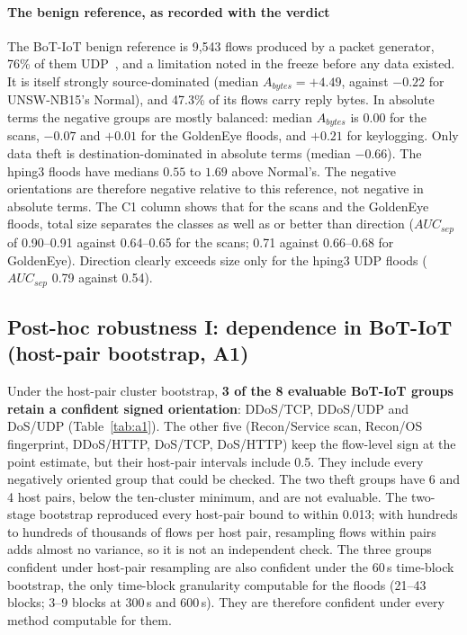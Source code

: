 \documentclass[preprint,12pt]{elsarticle}
\begin{document}
\paragraph{The benign reference, as recorded with the verdict} The BoT-IoT benign reference is 9{,}543 flows produced by a packet generator, 76\% of them UDP~\cite{koroniotis2019botiot}, and a limitation noted in the freeze before any data existed. It is itself strongly source-dominated (median $A_{bytes}=+4.49$, against $-0.22$ for UNSW-NB15's Normal), and 47.3\% of its flows carry reply bytes. In absolute terms the negative groups are mostly balanced: median $A_{bytes}$ is $0.00$ for the scans, $-0.07$ and $+0.01$ for the GoldenEye floods, and $+0.21$ for keylogging. Only data theft is destination-dominated in absolute terms (median $-0.66$). The hping3 floods have medians $0.55$ to $1.69$ above Normal's. The negative orientations are therefore negative relative to this reference, not negative in absolute terms. The C1 column shows that for the scans and the GoldenEye floods, total size separates the classes as well as or better than direction ($AUC_{sep}$ of 0.90--0.91 against 0.64--0.65 for the scans; 0.71 against 0.66--0.68 for GoldenEye). Direction clearly exceeds size only for the hping3 UDP floods ($AUC_{sep}$ 0.79 against 0.54).

\subsection{Post-hoc robustness I: dependence in BoT-IoT (host-pair bootstrap, A1)}\label{sec:a1}

Under the host-pair cluster bootstrap, \textbf{3 of the 8 evaluable BoT-IoT groups retain a confident signed orientation}: DDoS/TCP, DDoS/UDP and DoS/UDP (Table~\ref{tab:a1}). The other five (Recon/Service scan, Recon/OS fingerprint, DDoS/HTTP, DoS/TCP, DoS/HTTP) keep the flow-level sign at the point estimate, but their host-pair intervals include 0.5. They include every negatively oriented group that could be checked. The two theft groups have 6 and 4 host pairs, below the ten-cluster minimum, and are not evaluable. The two-stage bootstrap reproduced every host-pair bound to within 0.013; with hundreds to hundreds of thousands of flows per host pair, resampling flows within pairs adds almost no variance, so it is not an independent check. The three groups confident under host-pair resampling are also confident under the 60\,s time-block bootstrap, the only time-block granularity computable for the floods (21--43 blocks; 3--9 blocks at 300\,s and 600\,s). They are therefore confident under every method computable for them.
\end{document}
